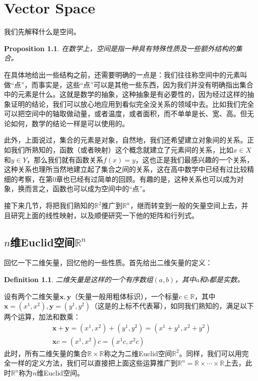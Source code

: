 \documentclass[11pt,a4paper,openany]{book}%
\theoremstyle{plain}%
\newtheorem{pro}{Proposition}[chapter]%
\newtheorem{defi}{Definition}[chapter]%
\begin{document}
\chapter{Vector Space}
我们先解释什么是空间。
\begin{pro}
\label{空间}
在数学上，空间是指一种具有特殊性质及一些额外结构的集合。
\end{pro}

\indent 在具体地给出一些结构之前，还需要明确的一点是：我们往往称空间中的元素叫做“点”，而事实是，这些“点”可以是其他一些东西，因为我们并没有明确指出集合中的元素是什么。这就是数学的抽象，这种抽象是有必要性的，因为经过这样的抽象证明的结论，我们可以放心地应用到看似完全没关系的领域中去。比如我们完全可以把空间中的轴取做动量，或者温度，或者面积，而不单单是长、宽、高。但无论如何，数学的结论一样是可以使用的。

此外，上面说过，集合的元素是对象，自然地，我们还希望建立对象间的关系。正如我们所熟知的，函数（或者映射）这个概念就建立了元素间的关系，比如$x\in X$和$y\in Y$，那么我们就有函数关系$f(x)=y$，这也正是我们最感兴趣的一个关系，这种关系也理所当然地建立起了集合之间的关系，这在高中数学中已经有过比较精细的考察，在第0章也已经有过简单的回顾。有趣的是，这种关系也可以成为对象，换而言之，函数也可以成为空间中的“点”。

接下来几节，将把我们熟知的$\mathbb{R}^{2}$推广到$\mathbb{R}^{n}$，继而转变到一般的矢量空间上去，并且研究上面的线性映射，以及顺便研究一下他的矩阵和行列式。
\section{$n$维Euclid空间$\mathbb{R}^{n}$}
回忆一下二维矢量，回忆他的一些性质。首先给出二维矢量的定义：
\begin{defi}
二维矢量是这样的一个有序数组$(a,b)$，其中$a$和$b$都是实数。
\end{defi}

设有两个二维矢量$\bm{x},\bm{y}$（矢量一般用粗体标识），一个标量$c \in \mathbb{R}$，其中$\bm{x}=(x^{1},x^{2}),\bm{y}=(y^{1},y^{2})$（这是的上标不代表幂），如同我们熟知的，满足以下两个运算，加法和数乘：
\begin{equation*}
\begin{split}
&\bm{x}+\bm{y}=(x^{1},x^{2})+(y^{1},y^{2})=(x^{1}+y^{1},x^{2}+y^{2})\\
&\bm{x}c=(x^{1},x^{2})c=(x^{1}c,x^{2}c)
\end{split}
\end{equation*}
此时，所有二维矢量的集合$\mathbb{R}\times \mathbb{R}$称之为二维{\rm Euclid}空间$\mathbb{R}^{2}$。同样，我们可以用完全一样的定义方法，我们可以直接把上面这些运算推广到$\mathbb{R}^{n}=\mathbb{R}\times \cdots \times \mathbb{R}$上去，此时$\mathbb{R}^{n}$称为$n$维{\rm Euclid}空间。
\end{document}
